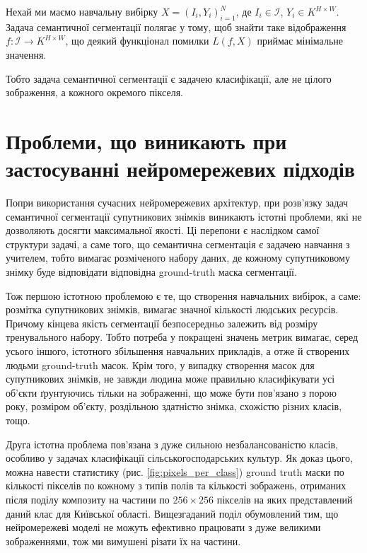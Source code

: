 \documentclass{ConfFTI}
\begin{document}
Нехай ми маємо навчальну вибірку $X=(I_i, Y_i)_{i=1}^{N}$,
де $I_i \in \mathcal{I}$, $Y_i \in K^{H \times W}$.
Задача семантичної сегментації полягає у тому, щоб
знайти таке відображення
$f: \mathcal{I} \rightarrow K^{H \times W}$, що деякий функціонал помилки
$L(f, X)$ приймає мінімальне значення.

Тобто задача семантичної сегментації є задачею класифікації, але
не цілого зображення, а кожного окремого пікселя.

\section{Проблеми, що виникають при застосуванні нейромережевих підходів}

Попри використання сучасних нейромережевих
архітектур, при розв'язку задач
семантичної сегментації супутникових знімків
виникають істотні проблеми, які не дозволяють
досягти максимальної якості. Ці перепони
є наслідком самої структури задачі, а саме того, що
семантична сегментація є задачею навчання з учителем, тобто вимагає розміченого
набору даних, де кожному супутниковому знімку буде
відповідати відповідна ground-truth маска сегментації.

Тож першою істотною проблемою є те, що створення
навчальних вибірок, а саме: розмітка супутникових знімків,
вимагає значної кількості людських ресурсів. Причому кінцева
якість сегментації безпосередньо залежить від
розміру тренувального набору. Тобто потреба у
покращені значень метрик вимагає, серед усього іншого,
істотного збільшення навчальних прикладів,
а отже й створених людьми ground-truth масок.
Крім того, у випадку створення масок для супутникових знімків,
не завжди людина може правильно класифікувати усі об'єкти ґрунтуючись
тільки на зображенні, що може бути пов'язано з порою року,
розміром об'єкту, роздільною здатністю знімка, схожістю різних класів, тощо.

Друга істотна проблема пов'язана з дуже сильною
незбалансованістю класів, особливо у задачах класифікації
сільськогосподарських культур. Як доказ цього, можна
навести статистику (рис. \ref{fig:pixels_per_class}) ground truth
маски по кількості пікселів по кожному з
типів полів та кількості зображень, отриманих після
поділу композиту на частини по $256 \times 256$ пікселів
на яких представлений даний клас для Київської області.
Вищезгаданий поділ обумовлений тим, що нейромережеві моделі не
можуть ефективно працювати з дуже великими зображеннями,
тож ми вимушені різати їх на частини.
\end{document}
